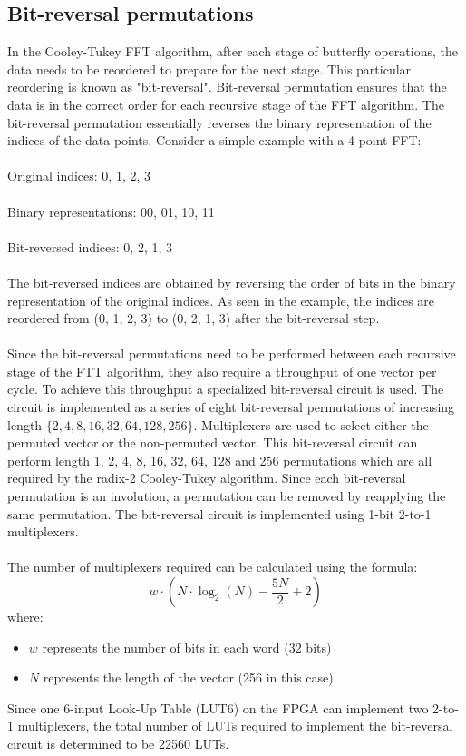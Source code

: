 \documentclass[english,master=eelt,masteroption=ec]{kulemt}
\begin{document}
\subsection{Bit-reversal permutations}
In the Cooley-Tukey FFT algorithm, after each stage of butterfly operations, the data needs to be reordered to prepare for the next stage. This particular reordering is known as "bit-reversal". Bit-reversal permutation ensures that the data is in the correct order for each recursive stage of the FFT algorithm.
The bit-reversal permutation essentially reverses the binary representation of the indices of the data points. Consider a simple example with a 4-point FFT:
\\\\
Original indices: 0, 1, 2, 3
\\\\
Binary representations: 00, 01, 10, 11
\\\\
Bit-reversed indices: 0, 2, 1, 3
\\\\
The bit-reversed indices are obtained by reversing the order of bits in the binary representation of the original indices. As seen in the example, the indices are reordered from (0, 1, 2, 3) to (0, 2, 1, 3) after the bit-reversal step.
\\\\
Since the bit-reversal permutations need to be performed between each recursive stage of the FTT algorithm, they also require a throughput of one vector per cycle. To achieve this throughput a specialized bit-reversal circuit is used. The circuit is implemented as a series of eight bit-reversal permutations of increasing length $\{2, 4, 8, 16, 32, 64, 128, 256\}$. Multiplexers are used to select either the permuted vector or the non-permuted vector. This bit-reversal circuit can perform length 1, 2, 4, 8, 16, 32, 64, 128 and 256 permutations which are all required by the radix-2 Cooley-Tukey algorithm. Since each bit-reversal permutation is an involution, a permutation can be removed by reapplying the same permutation. The bit-reversal circuit is implemented using 1-bit 2-to-1 multiplexers.
\\\\
The number of multiplexers required can be calculated using the formula:
\begin{equation}
w \cdot \left( N \cdot \log_2(N) - \frac{5N}{2} + 2 \right)
\end{equation}
where:
\begin{itemize}
\item{$w$ represents the number of bits in each word (32 bits)}
\item{$N$ represents the length of the vector (256 in this case)}
\end{itemize}
Since one 6-input Look-Up Table (LUT6) on the FPGA can implement two 2-to-1 multiplexers, the total number of LUTs required to implement the bit-reversal circuit is determined to be 22560 LUTs.
\end{document}
